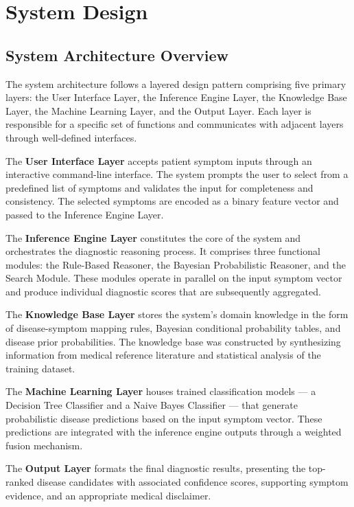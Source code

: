 \documentclass[12pt,a4paper]{article}
\begin{document}
\section{System Design}

\subsection{System Architecture Overview}

The system architecture follows a layered design pattern comprising five primary layers: the User Interface Layer, the Inference Engine Layer, the Knowledge Base Layer, the Machine Learning Layer, and the Output Layer. Each layer is responsible for a specific set of functions and communicates with adjacent layers through well-defined interfaces.

The \textbf{User Interface Layer} accepts patient symptom inputs through an interactive command-line interface. The system prompts the user to select from a predefined list of symptoms and validates the input for completeness and consistency. The selected symptoms are encoded as a binary feature vector and passed to the Inference Engine Layer.

The \textbf{Inference Engine Layer} constitutes the core of the system and orchestrates the diagnostic reasoning process. It comprises three functional modules: the Rule-Based Reasoner, the Bayesian Probabilistic Reasoner, and the Search Module. These modules operate in parallel on the input symptom vector and produce individual diagnostic scores that are subsequently aggregated.

The \textbf{Knowledge Base Layer} stores the system's domain knowledge in the form of disease-symptom mapping rules, Bayesian conditional probability tables, and disease prior probabilities. The knowledge base was constructed by synthesizing information from medical reference literature and statistical analysis of the training dataset.

The \textbf{Machine Learning Layer} houses trained classification models --- a Decision Tree Classifier and a Naive Bayes Classifier --- that generate probabilistic disease predictions based on the input symptom vector. These predictions are integrated with the inference engine outputs through a weighted fusion mechanism.

The \textbf{Output Layer} formats the final diagnostic results, presenting the top-ranked disease candidates with associated confidence scores, supporting symptom evidence, and an appropriate medical disclaimer.
\end{document}
